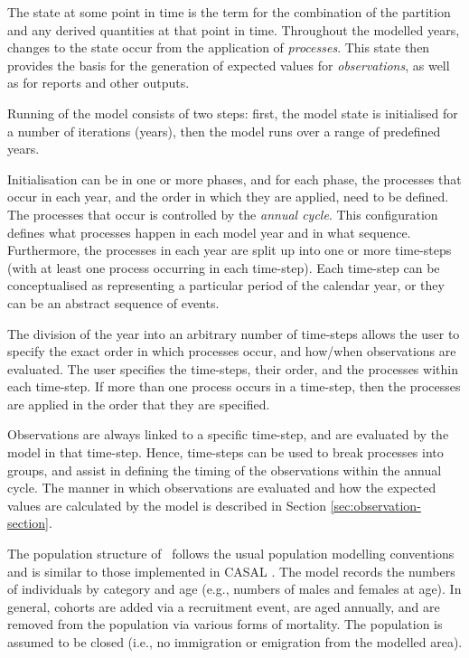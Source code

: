 The state at some point in time is the term for the combination of the partition and any derived quantities at that point in time. Throughout the modelled years, changes to the state occur from the application of \emph{processes}. This state then provides the basis for the generation of expected values for \emph{observations}, as well as for reports and other outputs.

Running of the model consists of two steps: first, the model state is initialised for a number of iterations (years), then the model runs over a range of predefined years. 

Initialisation can be in one or more phases, and for each phase, the processes that occur in each year, and the order in which they are applied, need to be defined. The processes that occur is controlled by the \emph{annual cycle}. This configuration defines what processes happen in each model year and in what sequence. Furthermore, the processes in each year are split up into one or more time-steps (with at least one process occurring in each time-step). Each time-step can be conceptualised as representing a particular period of the calendar year, or they can be an abstract sequence of events.

The division of the year into an arbitrary number of time-steps allows the user to specify the exact order in which processes occur, and how/when observations are evaluated. The user specifies the time-steps, their order, and the processes within each time-step. If more than one process occurs in a time-step, then the processes are applied in the order that they are specified. 

Observations are always linked to a specific time-step, and are evaluated by the model in that time-step. Hence, time-steps can be used to break processes into groups, and assist in defining the timing of the observations within the annual cycle. The manner in which observations are evaluated and how the expected values are calculated by the model is described in Section \ref{sec:observation-section}.

The population structure of \CNAME\ follows the usual population modelling conventions and is similar to those implemented in CASAL \citep{1388}. The model records the numbers of individuals by category and age (e.g., numbers of males and females at age). In general, cohorts are added via a recruitment event, are aged annually, and are removed from the population via various forms of mortality. The population is assumed to be closed (i.e., no immigration or emigration from the modelled area).

